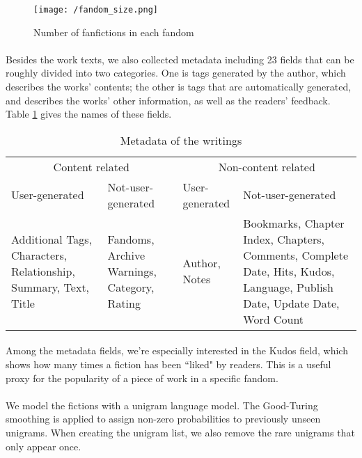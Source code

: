 \documentclass[11pt]{article} %
\begin{document}
\begin{figure}[htbp]
\begin{center}
\texttt{[image: /fandom\_size.png]}
\caption{Number of fanfictions in each fandom}
\label{fig:fandom_size}
\end{center}
\end{figure}


\paragraph{} Besides the work texts, we also collected metadata including 23 fields that can be roughly divided into two categories. One is tags generated by the author, which describes the works' contents; the other is tags that are automatically generated, and describes the works’ other information, as well as the readers' feedback. Table \ref{tab:metadata} gives the names of these fields. 

\begin{table}[htp]
\caption{Metadata of the writings}
\begin{center}
\begin{tabular}{p{3cm}|p{3cm}|p{3cm}|p{3cm}}
  \hline			
 \multicolumn{2}{c}{ Content related} & \multicolumn{2}{c}{Non-content related}\\ 
 User-generated & Not-user-generated &  User-generated & Not-user-generated \\
\hline
Additional Tags, Characters, Relationship, Summary, Text, Title
 & Fandoms,  Archive Warnings, Category, Rating
& Author, Notes
& Bookmarks, Chapter Index, Chapters, Comments, Complete Date, Hits, Kudos, Language, Publish Date, Update Date, Word Count\\
\hline
\end{tabular}
\end{center}
\label{tab:metadata}
\end{table}%

\paragraph{} Among the metadata fields, we're especially interested in the Kudos field, which shows how many times a fiction has been ``liked" by readers. This is a useful proxy for the popularity of a piece of work in a specific fandom.

\paragraph{} We model the fictions with a unigram language model. The Good-Turing smoothing\cite{gales1995good} is applied to assign non-zero probabilities to previously unseen unigrams. When creating the unigram list, we also remove the rare unigrams that only appear once.
\end{document}

